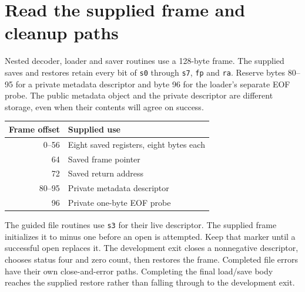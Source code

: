 \section{Read the supplied frame and cleanup paths}
Nested decoder, loader and saver routines use a 128-byte frame. The supplied saves and
restores retain every bit of \texttt{s0} through \texttt{s7}, \texttt{fp} and
\texttt{ra}. Reserve bytes 80--95 for a private metadata descriptor and byte 96 for the
loader's separate EOF probe. The public metadata object and the private descriptor are
different storage, even when their contents will agree on success.
\begin{center}
\begin{tabular}{rl}
Frame offset & Supplied use \\
\hline
0--56 & Eight saved registers, eight bytes each \\
64 & Saved frame pointer \\
72 & Saved return address \\
80--95 & Private metadata descriptor \\
96 & Private one-byte EOF probe \\
\end{tabular}
\end{center}

The guided file routines use \texttt{s3} for their live descriptor. The supplied frame
initializes it to minus one before an open is attempted. Keep that marker until a
successful open replaces it. The development exit closes a nonnegative descriptor,
chooses status four and zero count, then restores the frame. Completed file errors
have their own close-and-error paths. Completing the final load/save body reaches the
supplied restore rather than falling through to the development exit.
